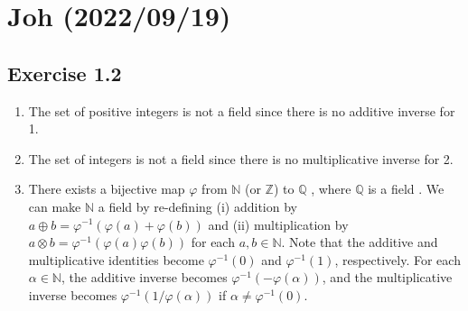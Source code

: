 \documentclass{article}
\begin{document}
\section{Joh (2022/09/19)}
\subsection{Exercise 1.2}
\begin{enumerate}[label = (\alph*)]
  \item The set of positive integers is not a field since there is no additive inverse for 1.
  \item The set of integers is not a field since there is no multiplicative inverse for 2.
  \item There exists a bijective map $\varphi$ from $\mathbb{N}$ (or $\mathbb{Z}$) to $\mathbb{Q}$ \cite{Q_countable}, where $\mathbb{Q}$ is a field \cite{Q_field}.
  	We can make $\mathbb{N}$ a field by re-defining (i) addition by $a \oplus b = \varphi^{-1} (\varphi(a) + \varphi(b))$ and (ii) multiplication by $a \otimes b = \varphi^{-1}(\varphi(a)\varphi(b))$ for each $a, b \in \mathbb{N}$.
	Note that the additive and multiplicative identities become $\varphi^{-1}(0)$ and $\varphi^{-1}(1)$, respectively.
	For each $\alpha\in\mathbb{N}$, the additive inverse becomes $\varphi^{-1}(-\varphi(\alpha))$, and the multiplicative inverse becomes $\varphi^{-1}(1/\varphi(\alpha))$ if $\alpha\ne\varphi^{-1}(0)$.
	

\end{enumerate}
\end{document}
